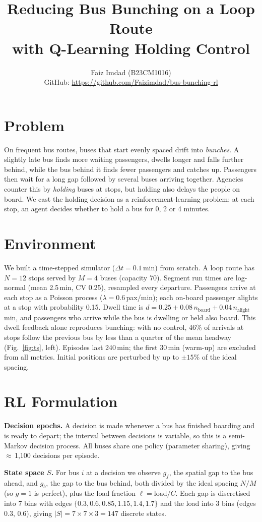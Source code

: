 \documentclass[10pt,twocolumn,a4paper]{article}
\title{\vspace{-0.9cm}\textbf{Reducing Bus Bunching on a Loop Route\\with Q-Learning Holding Control}}
\author{Faiz Imdad (B23CM1016)\\
\small GitHub: \url{https://github.com/Faizimdad/bus-bunching-rl}}
\date{\vspace{-0.9cm}}
\begin{document}
\maketitle

\section{Problem}
On frequent bus routes, buses that start evenly spaced drift into \emph{bunches}.
A slightly late bus finds more waiting passengers, dwells longer and falls further
behind, while the bus behind it finds fewer passengers and catches up. Passengers
then wait for a long gap followed by several buses arriving together. Agencies
counter this by \emph{holding} buses at stops, but holding also delays the people
on board. We cast the holding decision as a reinforcement-learning problem: at each
stop, an agent decides whether to hold a bus for 0, 2 or 4 minutes.

\section{Environment}
We built a time-stepped simulator ($\Delta t=0.1$\,min) from scratch. A loop route
has $N{=}12$ stops served by $M{=}4$ buses (capacity 70). Segment run times are
log-normal (mean 2.5\,min, CV 0.25), resampled every departure. Passengers arrive at
each stop as a Poisson process ($\lambda=0.6$\,pax/min); each on-board passenger
alights at a stop with probability 0.15. Dwell time is
$d=0.25+0.08\,n_{\text{board}}+0.04\,n_{\text{alight}}$\,min, and passengers who
arrive while the bus is dwelling or held also board. This dwell feedback alone
reproduces bunching: with no control, 46\% of arrivals at stops follow the previous
bus by less than a quarter of the mean headway (Fig.~\ref{fig:ts}, left). Episodes
last 240\,min; the first 30\,min (warm-up) are excluded from all metrics. Initial
positions are perturbed by up to $\pm15\%$ of the ideal spacing.

\section{RL Formulation}
\textbf{Decision epochs.} A decision is made whenever a bus has finished boarding
and is ready to depart; the interval between decisions is variable, so this is a
semi-Markov decision process. All buses share one policy (parameter sharing),
giving $\approx$\,1{,}100 decisions per episode.

\textbf{State space $S$.} For bus $i$ at a decision we observe
$g_f$, the spatial gap to the bus ahead, and $g_b$, the gap to the bus behind,
both divided by the ideal spacing $N/M$ (so $g=1$ is perfect), plus the load
fraction $\ell=\text{load}/C$. Each gap is discretised into 7 bins with edges
$\{0.3,0.6,0.85,1.15,1.4,1.7\}$ and the load into 3 bins (edges 0.3, 0.6), giving
$|S|=7\times7\times3=147$ discrete states.
\end{document}
